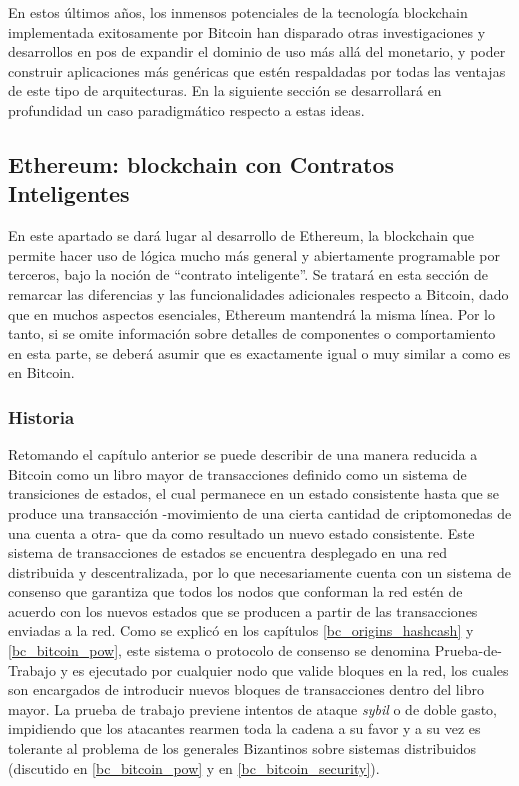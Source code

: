 En estos últimos años, los inmensos potenciales de la tecnología blockchain implementada exitosamente por Bitcoin han disparado otras investigaciones y desarrollos en pos de expandir el dominio de uso más allá del monetario, y poder construir aplicaciones más genéricas que estén respaldadas por todas las ventajas de este tipo de arquitecturas. En la siguiente sección se desarrollará en profundidad un caso paradigmático respecto a estas ideas.

\subsection{Ethereum: blockchain con Contratos Inteligentes}

En este apartado se dará lugar al desarrollo de Ethereum, la blockchain que permite hacer uso de lógica mucho más general y abiertamente programable por terceros, bajo la noción de ``contrato inteligente''. Se tratará en esta sección de remarcar las diferencias y las funcionalidades adicionales respecto a Bitcoin, dado que en muchos aspectos esenciales, Ethereum mantendrá la misma línea. Por lo tanto, si se omite información sobre detalles de componentes o comportamiento en esta parte, se deberá asumir que es exactamente igual o muy similar a como es en Bitcoin.

\subsubsection{Historia}

Retomando el capítulo anterior se puede describir de una manera reducida a Bitcoin como un libro mayor de transacciones definido como un sistema de transiciones de estados, el cual permanece en un estado consistente hasta que se produce una transacción -movimiento de una cierta cantidad de criptomonedas de una cuenta a otra- que da como resultado un nuevo estado consistente. Este sistema de transacciones de estados se encuentra desplegado en una red distribuida y descentralizada, por lo que necesariamente cuenta con un sistema de consenso que garantiza que todos los nodos que conforman la red estén de acuerdo con los nuevos estados que se producen a partir de las transacciones enviadas a la red. Como se explicó en los capítulos \ref{bc_origins_hashcash} y \ref{bc_bitcoin_pow}, este sistema o protocolo de consenso se denomina Prueba-de-Trabajo y es ejecutado por cualquier nodo que valide bloques en la red, los cuales son encargados de introducir nuevos bloques de transacciones dentro del libro mayor. La prueba de trabajo previene intentos de ataque \textit{sybil} o de doble gasto, impidiendo que los atacantes rearmen toda la cadena a su favor y a su vez es tolerante al problema de los generales Bizantinos sobre sistemas distribuidos (discutido en \ref{bc_bitcoin_pow} y en \ref{bc_bitcoin_security}).

